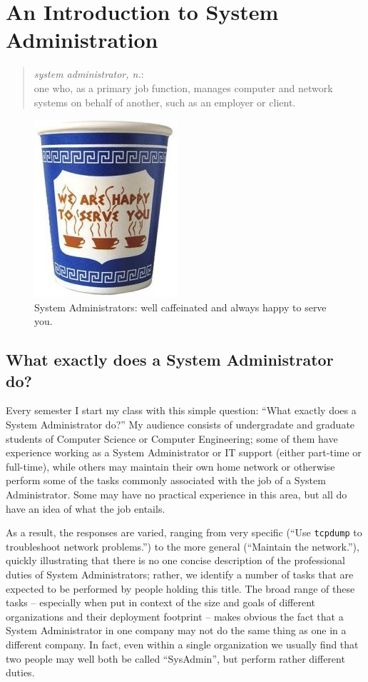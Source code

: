 \chapter[Introduction]
{An Introduction to System Administration}
\label{chap:introduction}

\begin{quote}
{\em system administrator, n.}:\\
one who, as a primary job function, manages computer and network systems
on behalf of another, such as an employer or client.\\
\end{quote}

\begin{figure}[hb]
	\raggedleft
	\includegraphics[width=.25\textwidth]{01/pics/we-are-happy-to-serve-you-coffee-mug}
	\caption[Anthora Coffee Cup]{System Administrators: well
		caffeinated and always happy to serve you.
		\label{fig:we-are-happy-to-serve-you}}
\end{figure}

\section{What exactly does a System Administrator do?}
\label{introduction:introduction}

Every semester I start my class with this simple
question: ``What exactly does a System Administrator
do?''  My audience consists of undergradate and
graduate students of Computer Science or Computer
Engineering; some of them have experience working as a
System Administrator or IT support (either part-time
or full-time), while others may maintain their own
home network or otherwise perform some of the tasks
commonly associated with the job of a System
Administrator.  Some may have no practical experience
in this area, but all do have an idea of what the job
entails.

As a result, the responses are varied, ranging from
very specific (``Use \verb+tcpdump+ to troubleshoot
network problems.'') to the more general (``Maintain
the network.''), quickly illustrating that there is no
one concise description of the professional duties of
System Administrators; rather, we identify a number of
tasks that are expected to be performed by people
holding this title.  The broad range of these tasks --
especially when put in context of the size and goals
of different organizations and their deployment
footprint -- makes obvious the fact that a System
Administrator in one company may not do the same thing
as one in a different company.  In fact, even within a
single organization we usually find that two people
may well both be called ``SysAdmin'', but perform
rather different duties.

